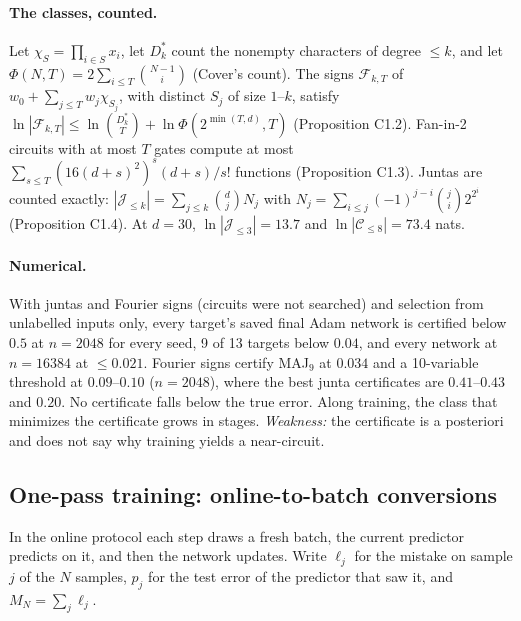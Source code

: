 \paragraph{The classes, counted.} Let $\chi_S=\prod_{i\in S}x_i$, let $D_k^*$ count the nonempty characters of degree $\le k$, and let $\Phi(N,T)=2\sum_{i\le T}\binom{N-1}i$ (Cover's count). The signs $\mathcal F_{k,T}$ of $w_0+\sum_{j\le T}w_j\chi_{S_j}$, with distinct $S_j$ of size $1$--$k$, satisfy $\ln|\mathcal F_{k,T}|\le\ln\binom{D_k^*}T+\ln\Phi(2^{\min(T,d)},T)$ (Proposition C1.2). Fan-in-2 circuits with at most $T$ gates compute at most $\sum_{s\le T}(16(d+s)^2)^s(d+s)/s!$ functions (Proposition C1.3). Juntas are counted exactly: $|\mathcal J_{\le k}|=\sum_{j\le k}\binom djN_j$ with $N_j=\sum_{i\le j}(-1)^{j-i}\binom ji2^{2^i}$ (Proposition C1.4). At $d=30$, $\ln|\mathcal J_{\le3}|=13.7$ and $\ln|\mathcal C_{\le8}|=73.4$ nats.

\paragraph{Numerical.} With juntas and Fourier signs (circuits were not searched) and selection from unlabelled inputs only, every target's saved final Adam network is certified below $0.5$ at $n=2048$ for every seed, 9 of 13 targets below $0.04$, and every network at $n=16384$ at $\le0.021$. Fourier signs certify MAJ$_9$ at $0.034$ and a 10-variable threshold at $0.09$--$0.10$ ($n=2048$), where the best junta certificates are $0.41$--$0.43$ and $0.20$. No certificate falls below the true error. Along training, the class that minimizes the certificate grows in stages. \emph{Weakness:} the certificate is a posteriori and does not say why training yields a near-circuit.

\subsection{One-pass training: online-to-batch conversions}\label{app:networks:online}

In the online protocol each step draws a fresh batch, the current predictor predicts on it, and then the network updates. Write $\ell_j$ for the mistake on sample $j$ of the $N$ samples, $p_j$ for the test error of the predictor that saw it, and $M_N=\sum_j\ell_j$.

